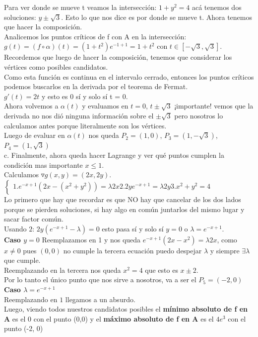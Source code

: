 \documentclass[10pt,a4paper]{article}
\begin{document}
Para ver donde se mueve t veamos la intersección: $1+y^{2} = 4$ acá tenemos dos soluciones: $ y \pm \sqrt{3}$. Esto lo que nos dice es por donde se mueve t. Ahora tenemos que hacer la composición. \\
Analicemos los puntos críticos de f con A en la intersección: $g(t) = (f \circ \alpha)(t) = (1+t^{2})e^{-1+1} = 1 + t^{2}$ con $t \in [-\sqrt{3}, \sqrt{3}]$. \\
Recordemos que luego de hacer la composición, tenemos que considerar los vértices como posibles candidatos. \\
Como esta función es continua en el intervalo cerrado, entonces los puntos críticos podemos buscarlos en la derivada por el teorema de Fermat. \\
$g'(t) = 2t$ y esto es 0 sí y solo sí t = 0. \\
Ahora volvemos a $\alpha(t)$ y evaluamos en $t=0$, $t \pm \sqrt{3}$ ¡importante! vemos que la derivada no nos dió ninguna información sobre el $\pm \sqrt{3}$ pero nosotros lo calculamos antes porque literalmente son los vértices. \\
Luego de evaluar en $\alpha(t)$ nos queda $P_{2} = (1,0)$, $P_{3} = (1, -\sqrt{3})$, $P_{4} = (1, \sqrt{3})$ \\
c. Finalmente, ahora queda hacer Lagrange y ver qué puntos cumplen la condición mas importante $x \le 1$. \\
Calculamos $\triangledown g(x,y) = (2x, 2y)$. \\
$
\begin{cases}
    1. e^{-x+1}(2x-(x^{2}+ y^{2})) = \lambda 2x 
    2. 2ye^{-x+1} = \lambda 2y 
    3. x^{2} + y^{2} = 4  
\end{cases}
$ \\
Lo primero que hay que recordar es que NO hay que cancelar de los dos lados porque se pierden soluciones, si hay algo en común juntarlos del mismo lugar y sacar factor común. \\
Usando $2$: $2y(e^{-x+1}-\lambda) = 0$ esto pasa sí y solo sí $y = 0$ o $\lambda = e^{-x+1}$. \\
\textbf{Caso $y = 0$}
Reemplazamos en 1 y nos queda $e^{-x+1}(2x-x^{2}) = \lambda 2x$, como $x \neq 0$ pues $(0,0)$ no cumple la tercera ecuación puedo despejar $\lambda$ y siempre $\exists \lambda$ que cumple. \\
Reemplazando en la tercera nos queda $x^{2} = 4$ que esto es $x \pm 2$. \\
Por lo tanto el único punto que nos sirve a nosotros, va a ser el $P_{5} = (-2, 0)$ \\
\textbf{Caso $\lambda = e^{-x+1}$} \\
Reemplazando en $1$ llegamos a un absurdo. \\
Luego, viendo todos nuestros candidatos posibles el \textbf{mínimo absoluto de f en A} es el 0 con el punto (0,0) y el \textbf{máximo absoluto de f en A} es el $4e^{3}$ con el punto (-2, 0) 
\end{document}
